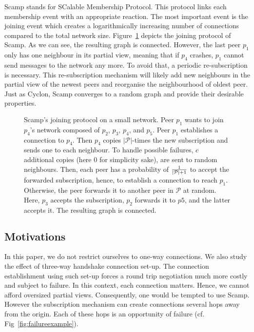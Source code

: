 \begin{asparadesc}
\item [Scamp]\cite{ganesh2003peer} stands for SCalable Membership
  Protocol. This protocol links each membership event with an appropriate
  reaction.  The most important event is the joining event which creates a
  logarithmically increasing number of connections compared to the total
  network size.  Figure~\ref{fig:scampexample} depicts the joining protocol of
  Scamp. As we can see, the resulting graph is connected. However, the last
  peer $p_1$ only has one neighbour in its partial view, meaning that if $p_4$
  crashes, $p_1$ cannot send messages to the network any more. To avoid that, a
  periodic re-subscription is necessary. This re-subscription mechanism will
  likely add new neighbours in the partial view of the newest peers and
  reorganise the neighbourhood of oldest peer. Just as Cyclon, Scamp converges
  to a random graph and provide their desirable properties.
\end{asparadesc}

\begin{figure}
  \centering
  
  \caption{\label{fig:scampexample} Scamp's joining protocol on a small
    network. Peer $p_1$ wants to join $p_4$'s network composed of $p_2$,
    $p_3$, $p_4$, and $p_5$. Peer $p_1$ establishes a connection to $p_4$. Then
    $p_4$ copies $|\mathcal{P}|$-times the new subscription and sends one to
    each neighbour. To handle possible failures, $c$ additional copies (here
    $0$ for simplicity sake), are sent to random neighbours. Then, each peer
    has a probability of $1\over{|\mathcal{P}|+1}$ to accept the forwarded
    subscription, hence, to establish a connection to reach $p_1$. Otherwise,
    the peer forwards it to another peer in $\mathcal{P}$ at random. Here,
    $p_3$ accepts the subscription, $p_2$ forwards it to $p5$, and the latter
    accepts it. The resulting graph is connected.}
\end{figure}

\subsection{Motivations}
In this paper, we do not restrict ourselves to one-way connections. We also
study the effect of three-way handshake connection set-up. The connection
establishment using such set-up forces a round trip negotiation much more
costly and subject to failure. In this context, each connection matters. Hence,
we cannot afford oversized partial views. Consequently, one would be tempted to
use Scamp. However the subscription mechanism can create connections several
hops away from the origin. Each of these hops is an opportunity of failure
(cf. Fig~\ref{fig:failureexample}).

